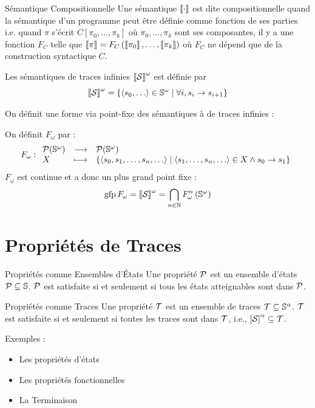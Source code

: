 \documentclass{cours}
\begin{document}
\begin{définition}{Sémantique Compositionnelle}{}
Une sémantique $\left\llbracket \cdot \right\rrbracket$ est dite compositionnelle quand la sémantique d'un programme peut être définie comme fonction de ses parties i.e. quand $\pi$ s'écrit $C\left[\pi_{0}, \ldots, \pi_{k}\right]$ où $\pi_{0}, \ldots, \pi_{k}$ sont ses composantes, il y a une fonction $F_{C}$ telle que $\left\llbracket \pi \right\rrbracket = F_{C}\left(\left\llbracket \pi_{0} \right\rrbracket, \ldots, \left\llbracket \pi_{k} \right\rrbracket\right)$ où $F_{C}$ ne dépend que de la construction syntactique $C$.
\end{définition}

\begin{définition}{}{}
Les sémantiques de traces infinies $\left\llbracket \mathcal{S} \right\rrbracket^{\omega}$ est définie par
\[
	\left\llbracket \mathcal{S} \right\rrbracket^{\omega} = \left\{\left\langle s_{0}, \ldots \right\rangle \in \mathbb{S}^{\omega}\mid \forall i, s_{i} \rightarrow s_{i + 1}\right\}
\]
\end{définition}

On définit une forme via point-fixe des sémantiques à de traces infinies :
\begin{définition}{}{}
On définit $F_{\omega}$ par :
\[
	F_{\omega} : \begin{array}{lcl}
		\mathcal{P}(\mathbb{S}^{\omega}) & \longrightarrow & \mathcal{P}(\mathbb{S}^{\omega})                                                                                                                   \\
		X                & \longmapsto     & \left\{\left\langle s_{0}, s_{1}, \ldots, s_{n}, \ldots \right\rangle \mid \left\langle s_{1}, \ldots, s_{n}, \ldots \right\rangle \in X \land s_{0} \to s_{1}\right\}
	\end{array}
\]
$F_{\omega}$ est continue et a donc un plus grand point fixe :
\[
	\operatorname{gfp} F_{\omega} = \left\llbracket \mathcal{S} \right\rrbracket^{\omega} = \bigcap_{n \in \mathbb{N}} F_{\omega}^{n}\left(\mathbb{S}^{\omega}\right)
\]
\end{définition}

\section{Propriétés de Traces}

\begin{définition}{Propriétés comme Ensembles d'États}{}
Une propriété $\mathcal{P}$ est un ensemble d'états $\mathcal{P} \subseteq \mathbb{S}$. $\mathcal{P}$ est satisfaite si et seulement si tous les états atteignables sont dans $\mathcal{P}$.
\end{définition}

\begin{définition}{Propriétés comme Traces}{}
Une propriété $\mathcal{T}$ est un ensemble de traces $\mathcal{T} \subseteq \mathbb{S}^{\alpha}$. $\mathcal{T}$ est satisfaite si et seulement si toutes les traces sont dans $\mathcal{T}$, i.e., $\left[\mathcal{S}\right]^{\alpha} \subseteq \mathcal{T}$.
\end{définition}
Exemples :
\begin{itemize}
	\item Les propriétés d'états
	\item Les propriétés fonctionnelles
	\item La Terminaison
\end{itemize}
\end{document}
